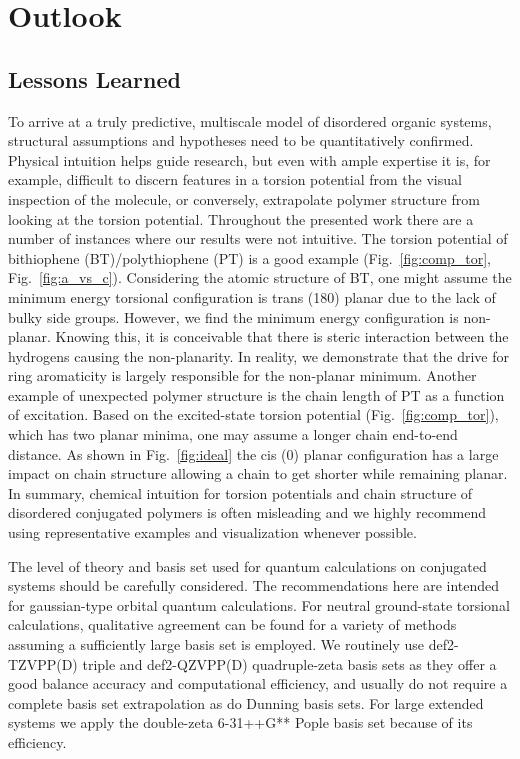 \chapter{Outlook}

\section{Lessons Learned}

To arrive at a truly predictive, multiscale model of disordered organic systems, structural assumptions and hypotheses need to be quantitatively confirmed. Physical intuition helps guide research, but even with ample expertise it is, for example, difficult to discern features in a torsion potential from the visual inspection of the molecule, or conversely, extrapolate polymer structure from looking at the torsion potential. Throughout the presented work there are a number of instances where our results were not intuitive. The torsion potential of bithiophene (BT)/polythiophene (PT) is a good example (Fig.~\ref{fig:comp_tor}, Fig.~\ref{fig:a_vs_c}). Considering the atomic structure of BT, one might assume the minimum energy torsional configuration is trans (180\textdegree) planar due to the lack of bulky side groups. However, we find the minimum energy configuration is non-planar. Knowing this, it is conceivable that there is steric interaction between the hydrogens causing the non-planarity. In reality, we demonstrate that the drive for ring aromaticity is largely responsible for the non-planar minimum. Another example of unexpected polymer structure is the chain length of PT as a function of excitation. Based on the excited-state torsion potential (Fig.~\ref{fig:comp_tor}), which has two planar minima, one may assume a longer chain end-to-end distance. As shown in Fig.~\ref{fig:ideal} the cis (0\textdegree) planar configuration has a large impact on chain structure allowing a chain to get shorter while remaining planar. In summary, chemical intuition for torsion potentials and chain structure of disordered conjugated polymers is often misleading and we highly recommend using representative examples and visualization whenever possible.

The level of theory and basis set used for quantum calculations on conjugated systems should be carefully considered. The recommendations here are intended for gaussian-type orbital quantum calculations. For neutral ground-state torsional calculations, qualitative agreement can be found for a variety of methods assuming a sufficiently large basis set is employed. We routinely use def2-TZVPP(D) triple and def2-QZVPP(D) quadruple-zeta basis sets as they offer a good balance accuracy and computational efficiency, and usually do not require a complete basis set extrapolation as do Dunning basis sets. For large extended systems we apply the double-zeta 6-31++G** Pople basis set because of its efficiency.

